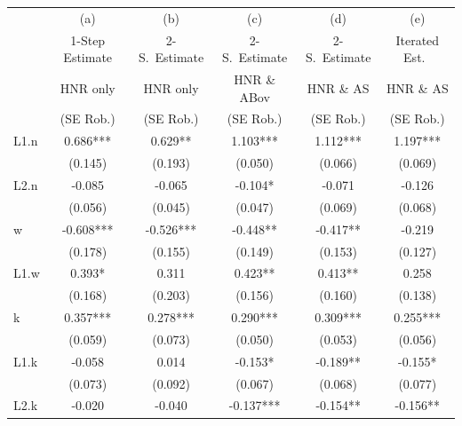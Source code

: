 \begin{table}[hptb]
\begin{tabular}{lccccc}
  \hline

                & (a)           & (b)           & (c)           & (d)           & (e)           \\
                & 1-Step Estimate      & 2-S.\ Estimate      & 2-S.\ Estimate      & 2-S.\ Estimate      & Iterated Est.\      \\
                & HNR only      & HNR only      & HNR \& ABov   & HNR \& AS     & HNR \& AS      \\
                & (SE Rob.)     & (SE Rob.)     & (SE Rob.)     & (SE Rob.)     & (SE Rob.)     \\
  \hline
  L1.n  & 0.686{***}      & 0.629{**}       & 1.103{***}      & 1.112{***}      & 1.197{***}           \\
        & (0.145)         & (0.193)         & (0.050)         & (0.066)         & (0.069)              \\
  L2.n  & -0.085          & -0.065          & -0.104{*}       & -0.071          & -0.126               \\
        & (0.056)         & (0.045)         & (0.047)         & (0.069)         & (0.068)              \\
  w     & -0.608{***}     & -0.526{***}     & -0.448{**}      & -0.417{**}      & -0.219               \\
        & (0.178)         & (0.155)         & (0.149)         & (0.153)         & (0.127)              \\
  L1.w  & 0.393{*}        & 0.311           & 0.423{**}       & 0.413{**}       & 0.258                \\
        & (0.168)         & (0.203)         & (0.156)         & (0.160)         & (0.138)              \\
  k     & 0.357{***}      & 0.278{***}      & 0.290{***}      & 0.309{***}      & 0.255{***}           \\
        & (0.059)         & (0.073)         & (0.050)         & (0.053)         & (0.056)              \\
  L1.k  & -0.058          & 0.014           & -0.153{*}       & -0.189{**}      & -0.155{*}            \\
        & (0.073)         & (0.092)         & (0.067)         & (0.068)         & (0.077)              \\
  L2.k  & -0.020          & -0.040          & -0.137{***}     & -0.154{**}      & -0.156{**}           \\

\end{tabular}
\end{table}
